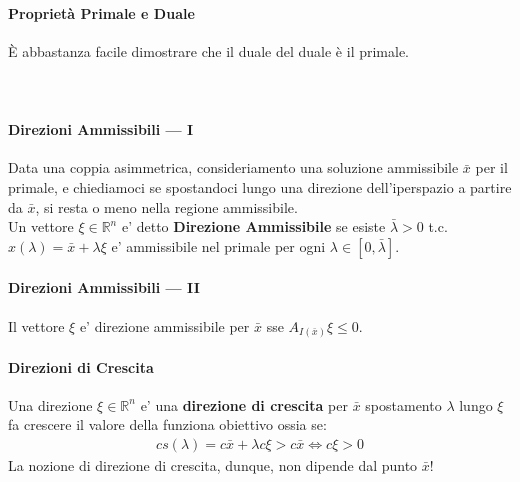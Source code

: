 \documentclass[a4paper,12pt]{article}
\begin{document}
\paragraph{Proprietà Primale e Duale} È abbastanza facile dimostrare che il duale del duale è il primale.\\
\vspace{1px}\\
\vspace{1px}\\
\paragraph{Direzioni Ammissibili — I} Data una coppia asimmetrica, consideriamento una soluzione ammissibile $\bar{x}$ per il primale, e chiediamoci se spostandoci lungo una direzione dell’iperspazio a partire da $\bar{x}$, si resta o meno nella regione ammissibile.\\
Un vettore $\xi \in \mathbb{R}^n$ e' detto \textbf{Direzione Ammissibile} se esiste $\bar{\lambda} > 0$ t.c. $x(\lambda) = \bar{x} + \lambda \xi$ e' ammissibile nel primale per ogni $\lambda \in [0, \bar{\lambda}]$.
\paragraph{Direzioni Ammissibili — II} Il vettore $\xi$ e' direzione ammissibile per $\bar{x}$ sse $A_{I(\bar{x})} \xi \leq 0$.
\paragraph{Direzioni di Crescita} Una direzione $\xi \in \mathbb{R}^n$ e' una \textbf{direzione di crescita} per $\bar{x}$ spostamento $\lambda$ lungo $\xi$ fa crescere il valore della funziona obiettivo ossia se:
\begin{align*}
  cs(\lambda) = c \bar{x} +\lambda c \xi > c \bar{x} \iff c \xi > 0
\end{align*}
La nozione di direzione di crescita, dunque, non dipende dal punto $\bar{x}$!
\end{document}
